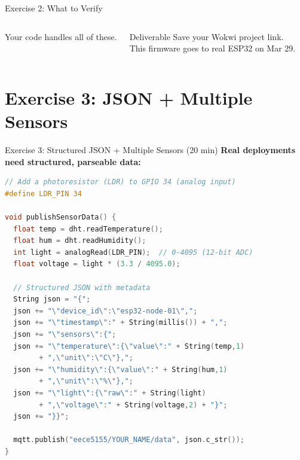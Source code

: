 \documentclass[aspectratio=169,11pt]{beamer}
\begin{document}
\begin{frame}[shrink=5]{Exercise 2: What to Verify}
\begin{columns}
{\begin{minipage}{0.9\textwidth}
            \vspace{0.1cm}
            Your code handles all of these.
            \vspace{0.1cm}
        \end{minipage}
        }

        \vspace{0.1cm}
        \begin{alertblock}{Deliverable}
            \small
            Save your Wokwi project link.\\
            This firmware goes to real ESP32 on Mar 29.
        \end{alertblock}
    \end{columns}
\end{frame}

\section{Exercise 3: JSON + Multiple Sensors}

\begin{frame}[fragile,shrink=5]{Exercise 3: Structured JSON + Multiple Sensors (20 min)}
    \textbf{Real deployments need structured, parseable data:}

    \vspace{0.1cm}
    \begin{lstlisting}[language=C]
// Add a photoresistor (LDR) to GPIO 34 (analog input)
#define LDR_PIN 34

void publishSensorData() {
  float temp = dht.readTemperature();
  float hum = dht.readHumidity();
  int light = analogRead(LDR_PIN);  // 0-4095 (12-bit ADC)
  float voltage = light * (3.3 / 4095.0);

  // Structured JSON with metadata
  String json = "{";
  json += "\"device_id\":\"esp32-node-01\",";
  json += "\"timestamp\":" + String(millis()) + ",";
  json += "\"sensors\":{";
  json += "\"temperature\":{\"value\":" + String(temp,1)
        + ",\"unit\":\"C\"},";
  json += "\"humidity\":{\"value\":" + String(hum,1)
        + ",\"unit\":\"%\"},";
  json += "\"light\":{\"raw\":" + String(light)
        + ",\"voltage\":" + String(voltage,2) + "}";
  json += "}}";

  mqtt.publish("eece5155/YOUR_NAME/data", json.c_str());
}
    \end{lstlisting}

    \vspace{0.1cm}
\end{frame}
\end{document}
